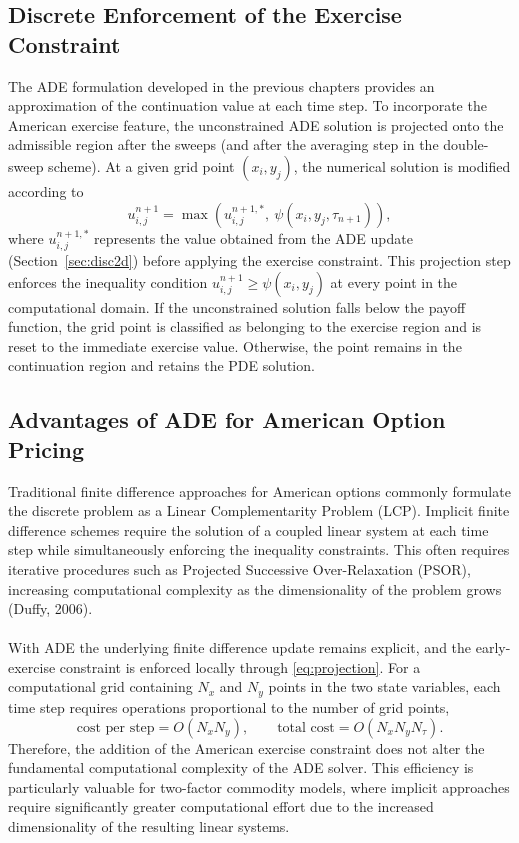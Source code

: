 \documentclass[12pt,a4paper]{article}
\begin{document}
\subsection{Discrete Enforcement of the Exercise Constraint}

The ADE formulation developed in the previous chapters provides an approximation of the continuation value at each time step. To incorporate the American exercise feature, the unconstrained ADE solution is projected onto the admissible region after the sweeps (and after the averaging step in the double-sweep scheme). At a given grid point $(x_i,y_j)$, the numerical solution is modified according to
\begin{equation}\label{eq:projection}
u_{i,j}^{n+1}=\max\left(u_{i,j}^{n+1,*},\ \psi(x_i,y_j,\tau_{n+1})\right),
\end{equation}
where $u_{i,j}^{n+1,*}$ represents the value obtained from the ADE update (Section~\ref{sec:disc2d}) before applying the exercise constraint. This projection step enforces the inequality condition $u_{i,j}^{n+1}\geq\psi(x_i,y_j)$ at every point in the computational domain. If the unconstrained solution falls below the payoff function, the grid point is classified as belonging to the exercise region and is reset to the immediate exercise value. Otherwise, the point remains in the continuation region and retains the PDE solution.

\subsection{Advantages of ADE for American Option Pricing}

Traditional finite difference approaches for American options commonly formulate the discrete problem as a Linear Complementarity Problem (LCP). Implicit finite difference schemes require the solution of a coupled linear system at each time step while simultaneously enforcing the inequality constraints. This often requires iterative procedures such as Projected Successive Over-Relaxation (PSOR), increasing computational complexity as the dimensionality of the problem grows (Duffy, 2006).\\\\
With ADE the underlying finite difference update remains explicit, and the early-exercise constraint is enforced locally through \eqref{eq:projection}. For a computational grid containing $N_x$ and $N_y$ points in the two state variables, each time step requires operations proportional to the number of grid points,
\begin{equation}
\text{cost per step}=O(N_xN_y),\qquad \text{total cost}=O(N_xN_yN_\tau).
\end{equation}
Therefore, the addition of the American exercise constraint does not alter the fundamental computational complexity of the ADE solver. This efficiency is particularly valuable for two-factor commodity models, where implicit approaches require significantly greater computational effort due to the increased dimensionality of the resulting linear systems.
\end{document}
